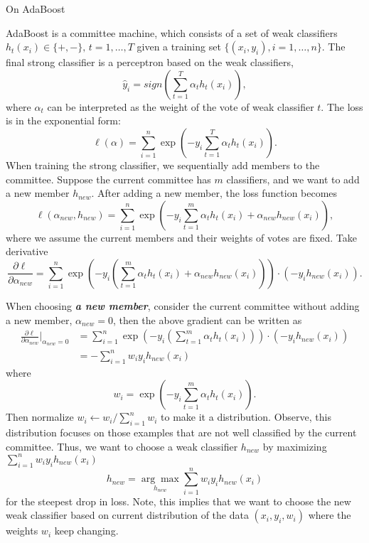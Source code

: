 \documentclass[11pt]{article}
\begin{document}
\begin{center}
{\LARGE On AdaBoost} 
\end{center}

AdaBoost is a committee machine, which consists of a set of weak classifiers $h_t(x_i)\in\{+,-\},\,t=1,\ldots,T$ given a training set $\{(x_i,y_i), i=1,\ldots,n\}$. The final strong classifier is a perceptron based on the weak classifiers,
\begin{equation}
\hat{y}_i = sign\left( \sum_{t=1}^T \alpha_t h_t(x_i) \right),
\end{equation}
where $\alpha_t$ can be interpreted as the weight of the vote of weak classifier $t$. The loss is in the exponential form:
\begin{equation}
\ell(\alpha) = \sum_{i=1}^n \exp \left(-y_i \sum_{t=1}^T \alpha_th_t(x_i) \right).
\end{equation}
When training the strong classifier, we sequentially add members to the committee. Suppose the current committee has $m$ classifiers, and we want to add a new member $h_{new}$. After adding a new member, the loss function becomes
\begin{equation}
\ell(\alpha_{new}, h_{new}) = \sum_{i=1}^n \exp\left( -y_i \sum_{t=1}^m \alpha_th_t(x_i)+\alpha_{new}h_{new}(x_i) \right),
\end{equation}
where we assume the current members and their weights of votes are fixed. Take derivative
\begin{equation}
\frac{\partial\ell}{\partial\alpha_{new}} = \sum_{i=1}^n\exp\left( -y_i(\sum_{t=1}^m \alpha_th_t(x_i)+\alpha_{new}h_{new}(x_i)) \right) \cdot (-y_ih_{new}(x_i)).
\end{equation}

When choosing \textit{\textbf{a new member}}, consider the current committee without adding a new member, $\alpha_{new}=0$, then the above gradient can be written as
\begin{align}
\frac{\partial\ell}{\partial\alpha_{new}} \bigg\rvert_{\alpha_{new}=0}
&= \sum_{i=1}^n\exp\left( -y_i(\sum_{t=1}^m \alpha_th_t(x_i)) \right) \cdot (-y_ih_{new}(x_i))\\
& = -\sum_{i=1}^n w_iy_ih_{new}(x_i)
\end{align}
where
\begin{equation}
w_i = \exp\left( -y_i \sum_{t=1}^m \alpha_th_t(x_i) \right).
\end{equation}
Then normalize $w_i \leftarrow w_i / \sum_{i=1}^n w_i$ to make it a distribution. Observe, this distribution focuses on those examples that are not well classified by the current committee. Thus, we want to choose a weak classifier $h_{new}$ by maximizing $\sum_{i=1}^n w_iy_ih_{new}(x_i)$
\begin{equation}
h_{new} = \underset{h_{new}}{\arg\max} \sum_{i=1}^n w_iy_ih_{new}(x_i)
\end{equation}
 for the steepest drop in loss. Note, this implies that we want to choose the new weak classifier based on current distribution of the data $(x_i,y_i, w_i)$ where the weights $w_i$ keep changing. 
\end{document}
